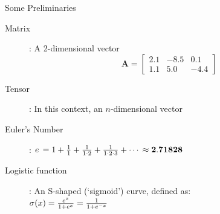\documentclass[xcolor=pdftex,x11names,table,hyperref]{beamer}
\begin{document}
\begin{frame}{Some Preliminaries}
\begin{description}
	\item[Matrix]: A 2-dimensional vector
	\begin{equation*}
	{\boldsymbol A} =
	\begin{bmatrix}
	2.1 & -8.5 & 0.1 \\
	1.1 & 5.0 & -4.4
	 \end{bmatrix}
	\end{equation*}
	\pause
	\item[Tensor]: In this context, an $n$-dimensional vector
	\pause
	\item[Euler's Number]: ${\mathnormal e} \, = 1 + \frac{1}{1} + \frac{1}{1\cdot 2} + \frac{1}{1\cdot 2\cdot 3} + \cdots \, \approx {\bf 2.71828} $
	\pause
	\item[Logistic function]: An S-shaped (`sigmoid') curve, defined as: \\[0.8em]
		$ \sigma(x) = \frac{{\mathnormal e}^x}{1 + {\mathnormal e}^x}  = \frac{1}{1 + {\mathnormal e}^{-x}} $   \hspace{1.5em}
\end{description}
\end{frame}
\end{document}
